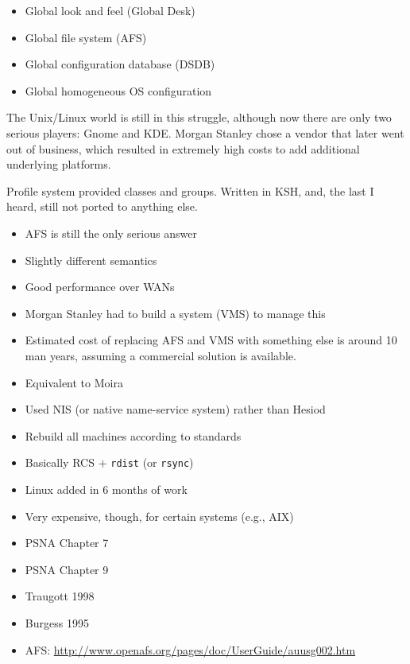 \documentclass{slides}
\newcommand{\bi}{\begin{itemize}}
\newcommand{\ei}{\end{itemize}}
\begin{document}

\bi
\item Global look and feel (Global Desk)
\item Global file system (AFS)
\item Global configuration database (DSDB)
\item Global homogeneous OS configuration
\ei


The Unix/Linux world is still in this struggle, although 
now there are only two serious players: Gnome and KDE.  Morgan
Stanley chose a vendor that later went out of business, which
resulted in extremely high costs to add additional underlying
platforms.

Profile system provided classes and groups.  Written in KSH, and,
the last I heard, still not ported to anything else.


\bi
\item AFS is still the only serious answer
\item Slightly different semantics
\item Good performance over WANs
\item Morgan Stanley had to build a system (VMS) to manage this
\item Estimated cost of replacing AFS and VMS with something else is 
	around 10 man years, assuming a commercial solution is
	available.
\ei


\bi
\item Equivalent to Moira
\item Used NIS (or native name-service system) rather than Hesiod
\ei


\bi
\item Rebuild all machines according to standards
\item Basically RCS $+$ {\tt rdist} (or {\tt rsync})
\item Linux added in 6 months of work
\item Very expensive, though, for certain systems (e.g., AIX)
\ei


\bi
\item PSNA Chapter 7
\item PSNA Chapter 9
\item Traugott 1998
\item Burgess 1995
\item AFS: \url{http://www.openafs.org/pages/doc/UserGuide/auusg002.htm}
\ei
\end{document}
